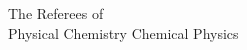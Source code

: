 \documentclass{scrlttr2}
\begin{document}
\begin{letter}{
    The Referees of\\
    Physical Chemistry Chemical Physics\\
    \vskip 0cm
  }



\end{letter} 
\end{document}
